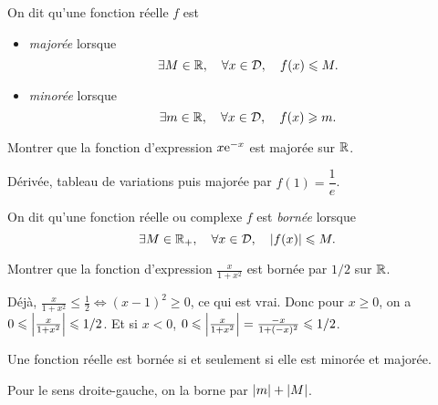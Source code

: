 \documentclass{magnoliaold}
\begin{document}
\begin{definition}[utile=-3]
On dit qu'une fonction réelle $f$ est
\begin{itemize}
\item \emph{majorée} lorsque
  \[\exists M\in\mathbb{R} ,\quad \forall x\in\mathcal{D} ,\quad
    f(x)\leqslant M.\]
\item \emph{minorée} lorsque
  \[\exists m\in\mathbb{R} ,\quad \forall x\in\mathcal{D} ,\quad
    f(x)\geqslant m.\]
\end{itemize}
\end{definition}

\begin{exoUnique}
\exo Montrer que la fonction d'expression $x {\rm e}^{-x}$ est majorée sur $\mathbb{R}$.
\end{exoUnique}

\begin{sol}
Dérivée, tableau de variations puis majorée par $f(1)=\dfrac{1}{e}$.
\end{sol}


\begin{definition}[utile=-3]
On dit qu'une fonction réelle ou complexe $f$ est \emph{bornée} lorsque
\[\exists M\in\mathbb{R}_+ ,\quad \forall x\in\mathcal{D} ,\quad
  \left|f(x)\right|\leqslant M.\]
\end{definition}

\begin{exoUnique}
\exo Montrer que la fonction d'expression $\frac{x}{1+x^2}$ est bornée par
  $1/2$ sur $\mathbb{R}$.
\end{exoUnique}

\begin{sol}
Déjà, $\frac{x}{1+x^2} \leq \frac{1}{2} \Longleftrightarrow (x-1)^2\geq 0$, ce qui est vrai.
Donc pour $x\geq 0$, on a $0\leqslant \left|\frac{x}{1+x^2}\right| \leqslant 1/2$. Et si $x<0$, $0\leqslant \left|\frac{x}{1+x^2}\right|=\frac{-x}{1+(-x)^2}\leqslant 1/2$.
\end{sol}

\begin{proposition}
Une fonction réelle est bornée si et seulement si elle est minorée et majorée.
\end{proposition}

\begin{preuve}
Pour le sens droite-gauche, on la borne par $\left|m\right|+\left|M\right|$.
\end{preuve}
\end{document}
